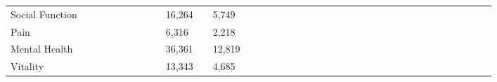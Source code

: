 {\begin{tabular}{l*{6}{llllll}}
Social Function     &                     &            &                     &            &                     &            &                     &            &      16,264         &            &       5,749         &            \\
Pain                &                     &            &                     &            &                     &            &                     &            &       6,316         &            &       2,218         &            \\
Mental Health       &                     &            &                     &            &                     &            &                     &            &      36,361         &            &      12,819         &            \\
Vitality            &                     &            &                     &            &                     &            &                     &            &      13,343         &            &       4,685         &            \\
\hline\hline
\end{tabular}
}
